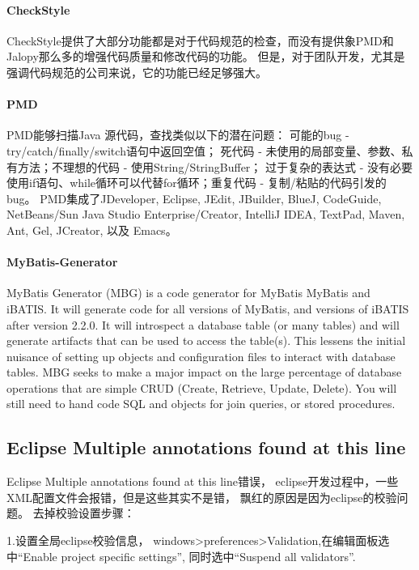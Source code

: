 \documentclass{book}
\begin{document}
\paragraph{CheckStyle}

CheckStyle提供了大部分功能都是对于代码规范的检查，而没有提供象PMD和Jalopy那么多的增强代码质量和修改代码的功能。
但是，对于团队开发，尤其是强调代码规范的公司来说，它的功能已经足够强大。

\paragraph{PMD}

PMD能够扫描Java 源代码，查找类似以下的潜在问题：
可能的bug - try/catch/finally/switch语句中返回空值；
死代码 - 未使用的局部变量、参数、私有方法；不理想的代码 - 使用String/StringBuffer；
过于复杂的表达式 - 没有必要使用if语句、while循环可以代替for循环；重复代码 - 复制/粘贴的代码引发的bug。
PMD集成了JDeveloper, Eclipse, JEdit, JBuilder, BlueJ, CodeGuide, 
NetBeans/Sun Java Studio Enterprise/Creator, IntelliJ IDEA, TextPad, Maven, Ant, Gel, JCreator, 以及 Emacs。

\paragraph{MyBatis-Generator}

MyBatis Generator (MBG) is a code generator for MyBatis MyBatis and iBATIS. 
It will generate code for all versions of MyBatis, and versions of iBATIS after version 2.2.0. 
It will introspect a database table (or many tables) and will generate artifacts 
that can be used to access the table(s). 
This lessens the initial nuisance of setting up objects and configuration files to interact 
with database tables. MBG seeks to make a major impact on the large percentage of database 
operations that are simple CRUD (Create, Retrieve, Update, Delete). 
You will still need to hand code SQL and objects for join queries, or stored procedures.

\subsection{Eclipse Multiple annotations found at this line}

Eclipse Multiple annotations found at this line错误，
eclipse开发过程中，一些XML配置文件会报错，但是这些其实不是错，
飘红的原因是因为eclipse的校验问题。
去掉校验设置步骤：

1.设置全局eclipse校验信息，
windows>preferences>Validation,在编辑面板选中“Enable project specific settings”,
同时选中“Suspend all validators”.
\end{document}
